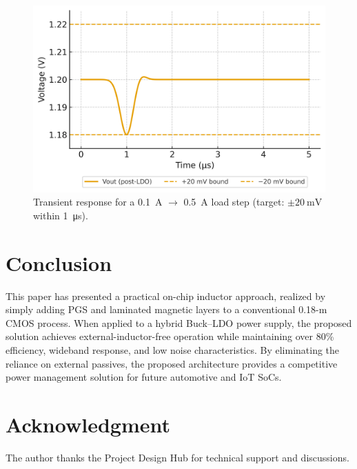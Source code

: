 \documentclass[journal]{IEEEtran}
\begin{document}
\begin{figure}[t]
  \centering
  \includegraphics[width=.95\linewidth]{fig/fig5_transient_response.png}
  \caption{Transient response for a \SI{0.1}{\ampere} $\rightarrow$ \SI{0.5}{\ampere} load step (target: $\pm\SI{20}{\milli\volt}$ within \SI{1}{\micro\second}).}
  \label{fig:transient}
\end{figure}

\section{Conclusion}
This paper has presented a practical on-chip inductor approach, realized by simply adding PGS and laminated magnetic layers to a conventional 0.18-\textmu m CMOS process. 
When applied to a hybrid Buck--LDO power supply, the proposed solution achieves external-inductor-free operation while maintaining over 80\% efficiency, wideband response, and low noise characteristics. 
By eliminating the reliance on external passives, the proposed architecture provides a competitive power management solution for future automotive and IoT SoCs.

\section*{Acknowledgment}
The author thanks the Project Design Hub for technical support and discussions.
\end{document}
